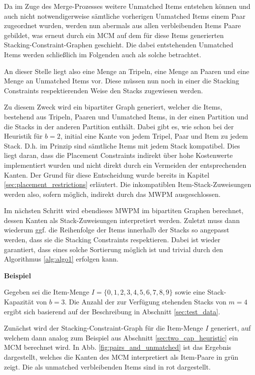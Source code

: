 Da im Zuge des Merge-Prozesses weitere Unmatched Items entstehen können und auch nicht notwendigerweise sämtliche vorherigen Unmatched Items
einem Paar zugeordnet wurden, werden nun abermals aus allen verbleibenden Items Paare gebildet, was erneut durch ein \textsc{MCM}
auf dem für diese Items generierten Stacking-Constraint-Graphen geschieht. Die dabei entstehenden Unmatched Items werden schließlich
im Folgenden auch als solche betrachtet.

An dieser Stelle liegt also eine Menge an Tripeln, eine Menge an Paaren und eine Menge an Unmatched Items vor. Diese müssen nun
noch in einer die Stacking Constraints respektierenden Weise den Stacks zugewiesen werden.

Zu diesem Zweck wird ein bipartiter Graph generiert, welcher die Items, bestehend aus Tripeln, Paaren und Unmatched Items, in der einen Partition
und die Stacks in der anderen Partition enthält. Dabei gibt es, wie schon bei der Heuristik für $b = 2$, initial eine Kante von jedem Tripel, Paar und Item zu jedem Stack. D.h. im Prinzip sind sämtliche Items mit jedem Stack kompatibel. Dies liegt daran, dass die Placement Constraints indirekt über hohe Kostenwerte implementiert wurden und nicht direkt durch ein Vermeiden der entsprechenden Kanten. Der Grund für diese Entscheidung wurde bereits in Kapitel \ref{sec:placement_restrictions} erläutert. Die inkompatiblen Item-Stack-Zuweisungen werden
also, sofern möglich, indirekt durch das \textsc{MWPM} ausgeschlossen.

\pagebreak

Im nächsten Schritt wird ebendieses \textsc{MWPM} im bipartiten Graphen berechnet, dessen Kanten
als Stack-Zuweisungen interpretiert werden. Zuletzt muss dann wiederum ggf. die Reihenfolge der Items innerhalb der Stacks so angepasst werden,
dass sie die Stacking Constraints respektieren. Dabei ist wieder garantiert, dass eines solche Sortierung möglich ist und trivial durch den
Algorithmus \ref{alg:algo1} erfolgen kann.\newline

\textbf{Beispiel}

Gegeben sei die Item-Menge $I = \{0, 1, 2, 3, 4, 5, 6, 7, 8, 9\}$ sowie eine Stack-Kapazität von $b = 3$. Die Anzahl der
zur Verfügung stehenden Stacks von $m = 4$ ergibt sich basierend auf der Beschreibung in Abschnitt \ref{sec:test_data}.

Zunächst wird der Stacking-Constraint-Graph für die Item-Menge $I$ generiert, auf welchem dann analog zum Beispiel aus Abschnitt
\ref{sec:two_cap_heuristic} ein \textsc{MCM} berechnet wird. In Abb. \ref{fig:pairs_and_unmatched} ist das Ergebnis dargestellt,
welches die Kanten des \textsc{MCM} interpretiert als Item-Paare in grün zeigt. Die als unmatched verbleibenden Items sind in rot dargestellt.

